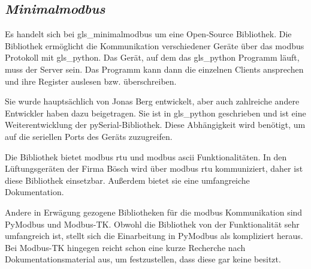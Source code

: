 \subsection{\textit{Minimalmodbus}} \label{minimalmodbus}
Es handelt sich bei \gls{gls_minimalmodbus} um eine Open-Source Bibliothek. Die Bibliothek ermöglicht die Kommunikation verschiedener Geräte über das \gls{modbus} Protokoll mit \gls{gls_python}. Das Gerät, auf dem das \gls{gls_python} Programm läuft, muss der Server sein. Das Programm kann dann die einzelnen Clients ansprechen und ihre Register auslesen bzw. überschreiben.

Sie wurde hauptsächlich von Jonas Berg entwickelt, aber auch zahlreiche andere Entwickler haben dazu beigetragen. Sie ist in \gls{gls_python} geschrieben und ist eine Weiterentwicklung der pySerial-Bibliothek. Diese Abhängigkeit wird benötigt, um auf die seriellen Ports des Geräts zuzugreifen. \cite[vgl.][]{Liechti_pySerial:o.J.}

Die Bibliothek bietet \gls{modbus} \acs{rtu} und \gls{modbus} \acs{ascii} Funktionalitäten. In den Lüftungsgeräten der Firma Bösch wird über \gls{modbus} \acs{rtu} kommuniziert, daher ist diese Bibliothek einsetzbar. Außerdem bietet sie eine umfangreiche Dokumentation.
\cite[vgl.][]{Berg_MiniModbus:2023, Berg_MiniModbus_Git:2023} 

Andere in Erwägung gezogene Bibliotheken für die \gls{modbus} Kommunikation sind PyModbus und Modbus-TK. Obwohl die Bibliothek von der Funktionalität sehr umfangreich ist, stellt sich die Einarbeitung in PyModbus als kompliziert heraus. Bei Modbus-TK hingegen reicht schon eine kurze Recherche nach Dokumentationsmaterial aus, um festzustellen, dass diese gar keine besitzt.